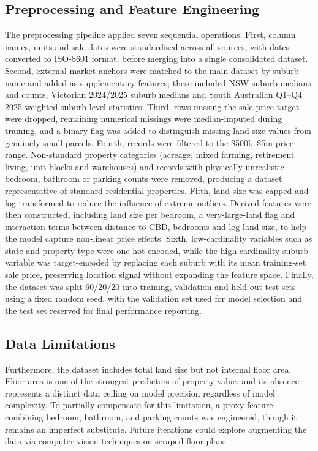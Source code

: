 \documentclass[a4paper,12pt]{article}
\begin{document}
\subsection{Preprocessing and Feature Engineering}
\label{sec:preprocessing}
The preprocessing pipeline applied seven sequential operations. First, column names, units and sale dates were standardised across all sources, with dates converted to ISO-8601 format, before merging into a single consolidated dataset. Second, external market anchors were matched to the main dataset by suburb name and added as supplementary features; these included NSW suburb medians and counts, Victorian 2024/2025 suburb medians and South Australian Q1–Q4 2025 weighted suburb-level statistics. Third, rows missing the sale price target were dropped, remaining numerical missings were median-imputed during training, and a binary flag was added to distinguish missing land-size values from genuinely small parcels. Fourth, records were filtered to the \$500k–\$5m price range. Non-standard property categories (acreage, mixed farming, retirement living, unit blocks and warehouses) and records with physically unrealistic bedroom, bathroom or parking counts were removed, producing a dataset representative of standard residential properties. Fifth, land size was capped and log-transformed to reduce the influence of extreme outliers. Derived features were then constructed, including land size per bedroom, a very-large-land flag and interaction terms between distance-to-CBD, bedrooms and log land size, to help the model capture non-linear price effects. Sixth, low-cardinality variables such as state and property type were one-hot encoded, while the high-cardinality suburb variable was target-encoded by replacing each suburb with its mean training-set sale price, preserving location signal without expanding the feature space. Finally, the dataset was split 60/20/20 into training, validation and held-out test sets using a fixed random seed, with the validation set used for model selection and the test set reserved for final performance reporting.


\subsection{Data Limitations}
Furthermore, the dataset includes total land size but not internal floor area. Floor area is one of the strongest predictors of property value, and its absence represents a distinct data ceiling on model precision regardless of model complexity. To partially compensate for this limitation, a proxy feature combining bedroom, bathroom, and parking counts was engineered, though it remains an imperfect substitute. Future iterations could explore augmenting the data via computer vision techniques on scraped floor plans.
\end{document}
